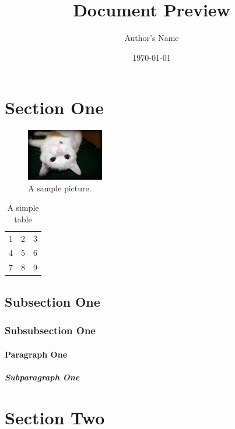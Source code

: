 \documentclass{doc}
\title{Document Preview}
\author{Author's Name}
\date{\today}
\begin{document}
\maketitle

\tableofcontents
\listoffigures
\listoftables

\begin{abstract}
\blindtext
\end{abstract}

\section{Section One}
\blindtext

\begin{figure}[ht]
	\includegraphics[width=0.3\textwidth]{myfigure}
	\caption{A sample picture.}
\end{figure}

\begin{table}[ht]
	\begin{tabular}{| l c r |}
		\hline
		1 & 2 & 3 \\
		4 & 5 & 6 \\
		7 & 8 & 9 \\
		\hline
	\end{tabular}
	\caption{A simple table}
\end{table}

\subsection{Subsection One}
\blindtext

\subsubsection{Subsubsection One}
\blindtext

\paragraph{Paragraph One}
\blindtext

\subparagraph{Subparagraph One}
\blindtext

\section{Section Two}
\blindtext
\end{document}
